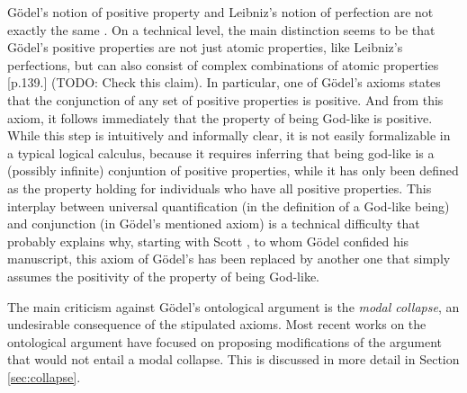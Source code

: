 \documentclass{llncs}
\begin{document}
G\"odel's notion of positive property and Leibniz's notion of perfection are not exactly the same \citep{Adams}. On a technical level, the main distinction seems to be that G\"odel's positive properties are not just atomic properties, like Leibniz's perfections, but can also consist of complex combinations of atomic properties \citep{fitting}[p.139.] (TODO: Check this claim). In particular, one of G\"odel's axioms states that the conjunction of any set of positive properties is positive. And from this axiom, it follows immediately that the property of being God-like is positive. While this step is intuitively and informally clear, it is not easily formalizable in a typical logical calculus, because it requires inferring that being god-like is a (possibly infinite) conjuntion of positive properties, while it has only been defined as the property holding for individuals who have all positive properties. This interplay between universal quantification (in the definition of a God-like being) and conjunction (in G\"odel's mentioned axiom) is a technical difficulty that probably explains why, starting with Scott \cite{scott}, to whom G\"odel confided his manuscript, this axiom of G\"odel's has been replaced by another one that simply assumes the positivity of the property of being God-like. 

The main criticism against G\"odel's ontological argument is the \emph{modal collapse}, an undesirable consequence of the stipulated axioms. Most recent works \cite{todo} on the ontological argument have focused on proposing modifications of the argument that would not entail a modal collapse. This is discussed in more detail in Section \ref{sec:collapse}.





\end{document}
